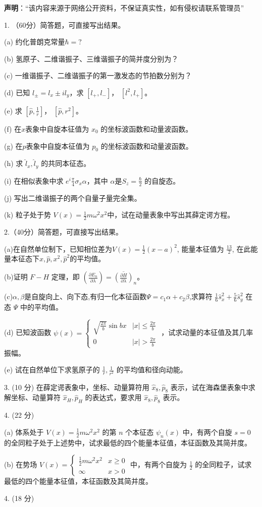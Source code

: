 
\textbf{声明}：“该内容来源于网络公开资料，不保证真实性，如有侵权请联系管理员”

1. （60分）简答题，可直接写出结果。

(a) 约化普朗克常量$\hbar = ?$

(b) 氢原子、二维谐振子、三维谐振子的简并度分别为？

(c) 一维谐振子、二维谐振子的第一激发态的节拍数分别为？

(d) 已知 $l_\pm = l_x \pm il_y $，求 $[l_+, l_-]$， $[l^2, l_+]$。

(e) 求 $[\hat p, \frac{1}{r}]$， $[\hat p, r^2]$。

(f) 在$x$表象中自旋本征值为 $x_0$ 的坐标波函数和动量波函数。

(g) 在$p$表象中自旋本征值为 $p_0$ 的坐标波函数和动量波函数。

(h) 求 $\hat l_x,\hat l_y$ 的共同本征态。

(i) 在相似表象中求 $e^i\frac{\pi}{4}\sigma_x\alpha$，其中 $\alpha$是$S_z =\frac{\hbar}{2} $ 的自旋态。

(j) 写出二维谐振子的两个自量子量完全集。

(k) 粒子处于势 $V(x) = \frac{1}{2}m\omega^2x^2$中，试在动量表象中写出其薛定谔方程。

2.（40分）简答题，可直接写出结果。

(a)在自然单位制下，已知相位差为$V(x) = \frac{1}{2} (x-a)^2$, 能量本征值为 $\frac{13}{2}$, 在此能量本征态下$x,\hat p,x^2,\hat p^2$的平均值。

(b)证明 $F-H$ 定理，即 
$\left( \frac{\partial E_{n}}{\partial \lambda} \right) = \overline{(\frac{\partial H}{\partial \lambda})} _n$。

(c)$\alpha,\beta$是自旋向上、向下态,有归一化本征函数$\Psi=c_1\alpha+c_2\beta$,求算符 $\frac{1}{6}\hat s_x^2 + \frac{5}{6}\hat s_y^2$ 在态 $\Psi$ 中的平均值。

(d) 已知波函数 $\psi(x) = 
\begin{cases} 
\sqrt{\frac{2\pi}{b}} \sin{bx} & |x| \leq \frac{2\pi}{b} \\
0 & |x| > \frac{2\pi}{b} 
\end{cases}$ ，试求动量的本征值及其几率振幅。

(e) 试在自然单位下求氢原子的 $\frac{1}{r},\frac{1}{r^2}$ 的平均值和径向动能。

3. (10 分) 在薛定谔表象中，坐标、动量算符用 $\hat x_8,\hat p_8$ 表示，试在海森堡表象中求解坐标、动量算符 $\hat x_H, \hat p_{H}$ 的表达式，要求用 $\hat x_8,\hat p_8$ 表示。

4. (22 分)

(a) 体系处于 $V(x) = \frac{1}{2}m\omega^2x^2$ 的第 $n$ 个本征态 $\psi_n(x)$ 中，有两个自旋 $s = 0$ 的全同粒子处于上述势中，试求最低的四个能量本征值，本征函数及其简并度。

(b) 在势场 $V(x) = 
\begin{cases} 
\frac{1}{2}m\omega^2x^2 & x \geq 0 \\
\infty & x > 0 
\end{cases}$ 中，有两个自旋为 $\frac{1}{2}$ 的全同粒子，试求最低的四个能量本征值，本征函数及其简并度。

4. (18 分)